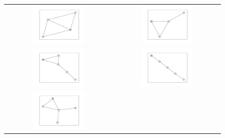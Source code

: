 \documentclass[12pt, a4paper]{extarticle}
\begin{document}
\begin{figure}\centering\begin{tabularx}{\textwidth}{cc}
\includegraphics[width=0.5\textwidth]{task11-graphlets/4_21-25-23-24.pdf} &
\includegraphics[width=0.5\textwidth]{task11-graphlets/4_14-21-25-23.pdf} \\
\includegraphics[width=0.5\textwidth]{task11-graphlets/5_16-17-25-23-24.pdf} &
\includegraphics[width=0.5\textwidth]{task11-graphlets/5_10-8-16-25-23.pdf} \\
\includegraphics[width=0.5\textwidth]{task11-graphlets/5_16-21-25-23-26.pdf} &

\end{tabularx}
\end{figure}
\end{document}
